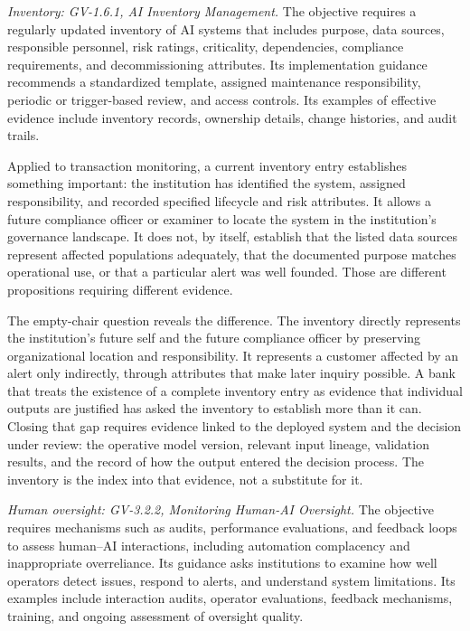 \emph{Inventory: GV-1.6.1, AI Inventory Management.} The objective requires a regularly updated inventory of AI systems that includes purpose, data sources, responsible personnel, risk ratings, criticality, dependencies, compliance requirements, and decommissioning attributes. Its implementation guidance recommends a standardized template, assigned maintenance responsibility, periodic or trigger-based review, and access controls. Its examples of effective evidence include inventory records, ownership details, change histories, and audit trails.

Applied to transaction monitoring, a current inventory entry establishes something important: the institution has identified the system, assigned responsibility, and recorded specified lifecycle and risk attributes. It allows a future compliance officer or examiner to locate the system in the institution's governance landscape. It does not, by itself, establish that the listed data sources represent affected populations adequately, that the documented purpose matches operational use, or that a particular alert was well founded. Those are different propositions requiring different evidence.

The empty-chair question reveals the difference. The inventory directly represents the institution's future self and the future compliance officer by preserving organizational location and responsibility. It represents a customer affected by an alert only indirectly, through attributes that make later inquiry possible. A bank that treats the existence of a complete inventory entry as evidence that individual outputs are justified has asked the inventory to establish more than it can. Closing that gap requires evidence linked to the deployed system and the decision under review: the operative model version, relevant input lineage, validation results, and the record of how the output entered the decision process. The inventory is the index into that evidence, not a substitute for it.

\emph{Human oversight: GV-3.2.2, Monitoring Human-AI Oversight.} The objective requires mechanisms such as audits, performance evaluations, and feedback loops to assess human--AI interactions, including automation complacency and inappropriate overreliance. Its guidance asks institutions to examine how well operators detect issues, respond to alerts, and understand system limitations. Its examples include interaction audits, operator evaluations, feedback mechanisms, training, and ongoing assessment of oversight quality.

